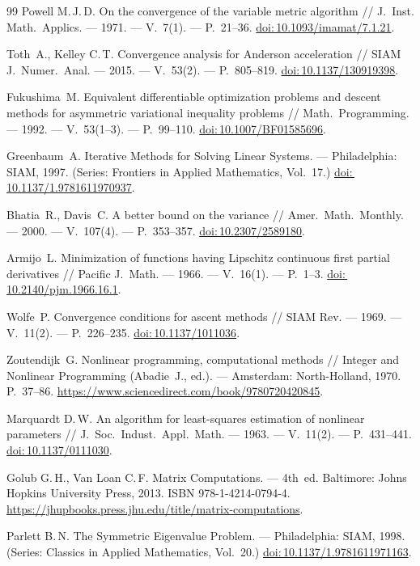 \begin{thebibliography}{99}
  Powell M.\,J.\,D. On the convergence of the variable metric algorithm //
  J.~Inst. Math.~Applics. --- 1971. --- V.~7(1). --- P.~21--36.
  \href{https://doi.org/10.1093/imamat/7.1.21}{doi:\,10.1093/imamat/7.1.21}.

  Toth~A., Kelley C.\,T. Convergence analysis for Anderson acceleration //
  SIAM J.~Numer.~Anal. --- 2015. --- V.~53(2). --- P.~805--819.
  \href{https://doi.org/10.1137/130919398}{doi:\,10.1137/130919398}.

  Fukushima~M. Equivalent differentiable optimization problems and
  descent methods for asymmetric variational inequality problems //
  Math.~Programming. --- 1992. --- V.~53(1--3). --- P.~99--110.
  \href{https://doi.org/10.1007/BF01585696}{doi:\,10.1007/BF01585696}.

  Greenbaum~A. Iterative Methods for Solving Linear Systems. ---
  Philadelphia: SIAM, 1997. (Series: Frontiers in Applied
  Mathematics, Vol.~17.)
  \href{https://doi.org/10.1137/1.9781611970937}{doi:\,10.1137/1.9781611970937}.

  Bhatia~R., Davis~C. A better bound on the variance //
  Amer.~Math.~Monthly. --- 2000. --- V.~107(4). --- P.~353--357.
  \href{https://doi.org/10.2307/2589180}{doi:\,10.2307/2589180}.

  Armijo~L. Minimization of functions having Lipschitz continuous first partial
  derivatives //
  Pacific J.~Math. --- 1966. --- V.~16(1). --- P.~1--3.
  \href{https://doi.org/10.2140/pjm.1966.16.1}{doi:\,10.2140/pjm.1966.16.1}.

  Wolfe~P. Convergence conditions for ascent methods //
  SIAM Rev. --- 1969. --- V.~11(2). --- P.~226--235.
  \href{https://doi.org/10.1137/1011036}{doi:\,10.1137/1011036}.

  Zoutendijk~G. Nonlinear programming, computational methods //
  Integer and Nonlinear Programming (Abadie~J., ed.). ---
  Amsterdam: North-Holland, 1970. P.~37--86.
  \url{https://www.sciencedirect.com/book/9780720420845}.

  Marquardt D.\,W. An algorithm for least-squares estimation of nonlinear
  parameters //
  J.~Soc.~Indust.~Appl.~Math. --- 1963. --- V.~11(2). --- P.~431--441.
  \href{https://doi.org/10.1137/0111030}{doi:\,10.1137/0111030}.

  Golub G.\,H., Van Loan C.\,F. Matrix Computations. ---
  4th~ed. Baltimore: Johns Hopkins University Press, 2013.
  ISBN 978-1-4214-0794-4. \url{https://jhupbooks.press.jhu.edu/title/matrix-computations}.

  Parlett B.\,N. The Symmetric Eigenvalue Problem. ---
  Philadelphia: SIAM, 1998. (Series: Classics in Applied
  Mathematics, Vol.~20.)
  \href{https://doi.org/10.1137/1.9781611971163}{doi:\,10.1137/1.9781611971163}.

\end{thebibliography}
